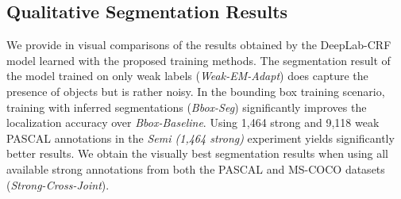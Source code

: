 

\subsection{Qualitative Segmentation Results} 
\label{sec:test_qualitative}

We provide in  visual comparisons of the
results obtained by the DeepLab-CRF model learned with the proposed
training methods. The segmentation result of the model trained on only
weak labels (\textsl{Weak-EM-Adapt}) does capture the presence of
objects but is rather noisy. In the bounding box training scenario,
training with inferred segmentations (\textsl{Bbox-Seg}) significantly
improves the localization accuracy over \textsl{Bbox-Baseline}. Using
1,464 strong and 9,118 weak PASCAL annotations in the \textsl{Semi
  (1,464 strong)} experiment yields significantly better results. We
obtain the visually best segmentation results when using all available
strong annotations from both the PASCAL and MS-COCO datasets
(\textsl{Strong-Cross-Joint}).

